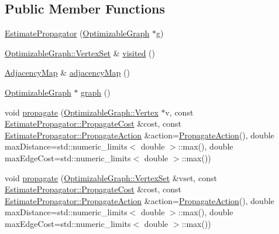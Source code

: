\subsection*{Public Member Functions}
\begin{DoxyCompactItemize}
\item 
\mbox{\hyperlink{classg2o_1_1_estimate_propagator_af245037ba41bfb02d531c11f5de4f7e8}{Estimate\+Propagator}} (\mbox{\hyperlink{structg2o_1_1_optimizable_graph}{Optimizable\+Graph}} $\ast$g)
\item 
\mbox{\hyperlink{classg2o_1_1_hyper_graph_a703938cdb4bb636860eed55a2489d70c}{Optimizable\+Graph\+::\+Vertex\+Set}} \& \mbox{\hyperlink{classg2o_1_1_estimate_propagator_a2d346a2411d969caa81817c15052cd58}{visited}} ()
\item 
\mbox{\hyperlink{classg2o_1_1_estimate_propagator_aa450038ec206c089ecf023cb88cb2847}{Adjacency\+Map}} \& \mbox{\hyperlink{classg2o_1_1_estimate_propagator_ad6dc3d18c4057915af4cc4986b568855}{adjacency\+Map}} ()
\item 
\mbox{\hyperlink{structg2o_1_1_optimizable_graph}{Optimizable\+Graph}} $\ast$ \mbox{\hyperlink{classg2o_1_1_estimate_propagator_a97064a86789b496b590f4848fdb59bc8}{graph}} ()
\item 
void \mbox{\hyperlink{classg2o_1_1_estimate_propagator_a3b1df65f9b89d81dff33cb140d4f75d4}{propagate}} (\mbox{\hyperlink{classg2o_1_1_optimizable_graph_1_1_vertex}{Optimizable\+Graph\+::\+Vertex}} $\ast$v, const \mbox{\hyperlink{classg2o_1_1_estimate_propagator_a67a42f9c6d5f92562ac4ea12f81c8d9c}{Estimate\+Propagator\+::\+Propagate\+Cost}} \&cost, const \mbox{\hyperlink{structg2o_1_1_estimate_propagator_1_1_propagate_action}{Estimate\+Propagator\+::\+Propagate\+Action}} \&action=\mbox{\hyperlink{structg2o_1_1_estimate_propagator_1_1_propagate_action}{Propagate\+Action}}(), double max\+Distance=std\+::numeric\+\_\+limits$<$ double $>$\+::max(), double max\+Edge\+Cost=std\+::numeric\+\_\+limits$<$ double $>$\+::max())
\item 
void \mbox{\hyperlink{classg2o_1_1_estimate_propagator_ae24b104ec3e8162bc75a70db9941f342}{propagate}} (\mbox{\hyperlink{classg2o_1_1_hyper_graph_a703938cdb4bb636860eed55a2489d70c}{Optimizable\+Graph\+::\+Vertex\+Set}} \&vset, const \mbox{\hyperlink{classg2o_1_1_estimate_propagator_a67a42f9c6d5f92562ac4ea12f81c8d9c}{Estimate\+Propagator\+::\+Propagate\+Cost}} \&cost, const \mbox{\hyperlink{structg2o_1_1_estimate_propagator_1_1_propagate_action}{Estimate\+Propagator\+::\+Propagate\+Action}} \&action=\mbox{\hyperlink{structg2o_1_1_estimate_propagator_1_1_propagate_action}{Propagate\+Action}}(), double max\+Distance=std\+::numeric\+\_\+limits$<$ double $>$\+::max(), double max\+Edge\+Cost=std\+::numeric\+\_\+limits$<$ double $>$\+::max())
\end{DoxyCompactItemize}
